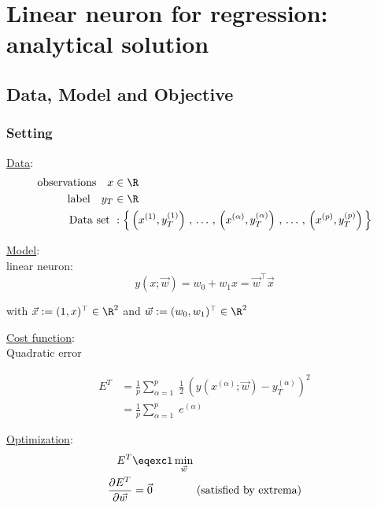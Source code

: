 \section{Linear neuron for regression: analytical solution}

\subsection{Data, Model and Objective}

\begin{frame}\frametitle{Setting}

\underline{Data}:\\

\begin{align*}
\text{observations} \quad x &\in \R \\
\text{label}        \quad y_{T} &\in \R \\
\text{Data set } &: \Big\{
\left(x^{(1)}, y_T^{(1)} 
\right)
\,,\, \ldots \,,\,
\left( x^{(\alpha)}, y_T^{(\alpha)} \right)
\,,\, \ldots \,,\, 
\left( x^{(p)}, y_T^{(p)} \right) 
\Big\}
\end{align*}

\pause

\underline{Model}:\\

linear neuron:
\begin{equation}
    y(x; \vec w) = w_{0} + w_{1} x = \vec w^{\top} \vec x
\end{equation}

with $\vec x := (1, x)^{\top} \in \R^{2}$ and $\vec w := (w_{0}, w_{1})^{\top} \in \R^{2}$

\end{frame}

\begin{frame}

\underline{Cost function}:\\

Quadratic error

\begin{align}
E^{T} &= \frac{1}{p} \sum_{\alpha=1}^{p} \;
\frac{1}{2} \, \left( y(x^{(\alpha)}; \vec w)- y^{(\alpha)}_{T}\right)^{2}\\
&= \frac{1}{p} \sum_{\alpha=1}^{p}
\;e^{(\alpha)}
\end{align}


\pause

\underline{Optimization}:\\

\begin{align}
E^{T} &\eqexcl \min_{\vec w}\\
\frac{\partial E^{T}}{\partial \vec w} &= \vec 0 \qquad\qquad \text{(satisfied by extrema)}
\label{eq:extremacond}
\end{align}
    
\end{frame}

